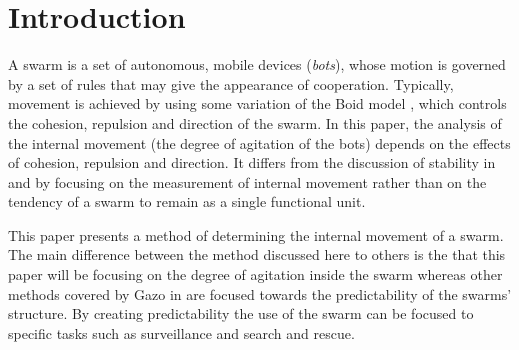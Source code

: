\documentclass[10pt,journal,letterpaper,twoside]{IEEEtran}
\newcommand{\stability}{internal movement}
\begin{document}
\IEEEdisplaynotcompsoctitleabstractindextext


%
\IEEEpeerreviewmaketitle

\section{Introduction\label{section:introduction}}

A swarm is a set of autonomous, mobile devices (\emph{bots}),
whose motion is governed by a set of rules that may give the appearance
of cooperation.
Typically, movement is
achieved by using some variation of the Boid model \cite{CR87}, which
controls the cohesion, repulsion and direction of the swarm.
In this paper, the analysis of
the \stability{} (the degree of agitation of the bots) depends
on the effects of cohesion, repulsion and direction.  It differs from the discussion
of stability in \cite{VGKP02} and \cite{XCFPLLHF06} by focusing on the
measurement of \stability{} rather than on the tendency of a swarm to remain as a single functional
unit.


This paper presents a method of determining the \stability{} of a
swarm. The main difference between the method discussed here to others
\cite{VGKP02} \cite{XCFPLLHF06} is the that this paper will be
focusing on the degree of agitation inside the swarm whereas other
methods covered by Gazo in \cite{VGKP11} are focused towards the
predictability of the swarms' structure. By creating predictability
the use of the swarm can be focused to specific tasks such as
surveillance and search and rescue.
\end{document}

